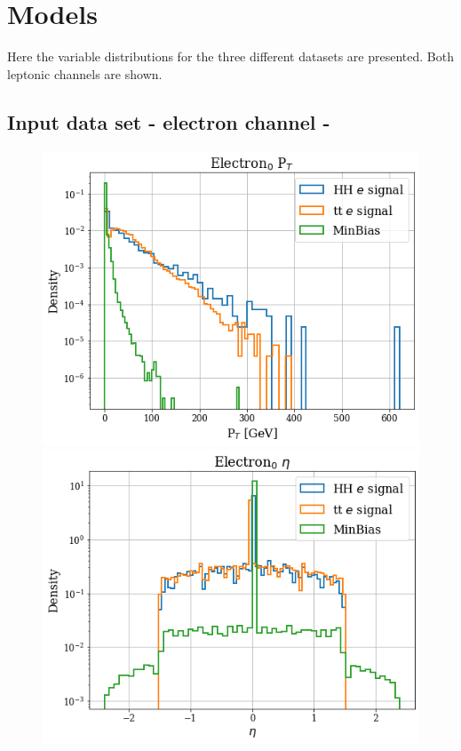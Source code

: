 \documentclass[../main.tex]{subfiles}
\begin{document}
\appendix

\chapter{Models}
\label{sec:App_Model}
Here the variable distributions for the three different datasets are presented. Both leptonic channels are shown.

\section{Input data set - electron channel -}
\begin{figure}[!ht] 
  \begin{minipage}[b]{0.33\linewidth}
    \centering
    \includegraphics[width=1\linewidth]{Chapters/Plots/Hist_1ele_electron0_Et.png}
  \end{minipage}%
  \begin{minipage}[b]{0.33\linewidth}
    \centering
    \includegraphics[width=1\linewidth]{Chapters/Plots/Hist_1ele_electron0_Eta.png}

\end{minipage}
\end{figure}
\end{document}
